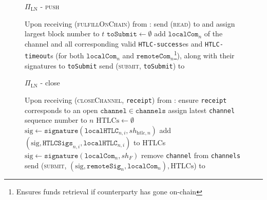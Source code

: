 \begin{figure}[H]
\begin{protocolbox}{$\Pi_{\mathrm{LN}}$ - \textsc{push}}
\begin{algorithmic}[1]
        \State Upon receiving (\textsc{fulfillOnChain}) from \environment:
        \Indent
          \State send (\textsc{read}) to \ledger{} and assign largest block
          number to $t$
          \State $\mathtt{toSubmit} \gets \emptyset$
          \label{alg:protocol:pay:foc:tosubmit}
              \State add $\mathtt{localCom}_n$ of the channel and all
              corresponding valid \texttt{HTLC-success}es and
              \texttt{HTLC-timeout}s (for both $\mathtt{localCom}_n$ and
              $\mathtt{remoteCom}_n$\footnote{Ensures funds retrieval if
              counterparty has gone on-chain}), along with their signatures to
              \texttt{toSubmit}
            \EndIf
          \EndFor
          \State send (\textsc{submit}, \texttt{toSubmit}) to \ledger
          \label{alg:protocol:pay:foc:submit}
        \EndIndent
      \end{algorithmic}
    \end{protocolbox}
    \caption{}
    \label{alg:protocol:pay:push}
  \end{figure}

  \begin{figure}[H]
    \begin{protocolbox}{$\Pi_{\mathrm{LN}}$ - close}
      \begin{algorithmic}[1]
        \State Upon receiving (\textsc{closeChannel}, \texttt{receipt}) from
        \environment:
        \Indent
          \State ensure \texttt{receipt} corresponds to an open
          $\mathtt{channel} \in \mathtt{channels}$
          \State assign latest \texttt{channel} sequence number to $n$
          \State $\mathrm{HTLCs} \gets \emptyset$
            \State $\mathrm{sig} \gets
            \mathtt{signature}\left(\mathtt{localHTLC}_{n, i},
            sh_{\mathrm{htlc}, n}\right)$
            \State add $\left(\mathrm{sig}, \mathtt{HTLCSigs}_{n, i},
            \mathtt{localHTLC}_{n, i}\right)$ to HTLCs
          \EndFor
          \State $\mathrm{sig} \gets
          \mathtt{signature}\left(\mathtt{localCom}_n, sh_F\right)$
          \State remove \texttt{channel} from \texttt{channels}
          \State send (\textsc{submit}, $\left(\mathrm{sig},
          \mathtt{remoteSig}_n, \mathtt{localCom}_n\right), \mathrm{HTLCs}$) to
          \ledger
        \EndIndent
      \end{algorithmic}
    \end{protocolbox}
    \caption{}
    \label{alg:protocol:close}
  \end{figure}

